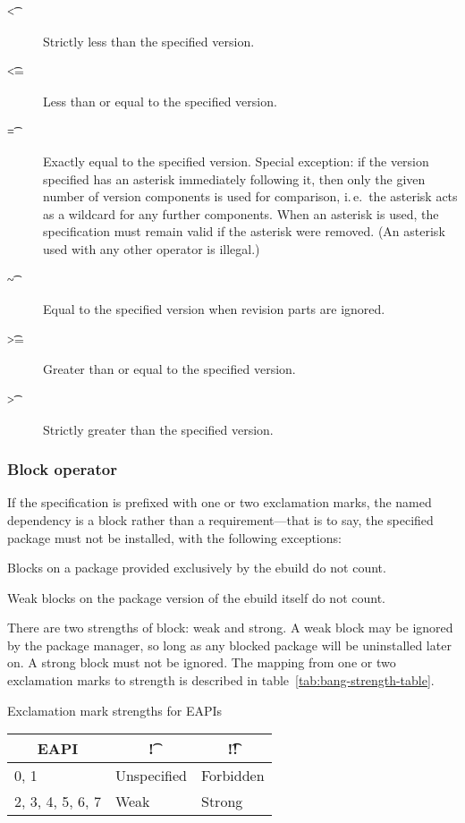 \begin{description}
\item[\t{<}] Strictly less than the specified version.
\item[\t{<=}] Less than or equal to the specified version.
\item[\t{=}] Exactly equal to the specified version. Special exception: if the version specified
    has an asterisk immediately following it, then only the given number of version components
    is used for comparison, i.\,e.\ the asterisk acts as a wildcard for any further components.
    When an asterisk is used, the specification must remain valid if the asterisk were removed.
    (An asterisk used with any other operator is illegal.)
\item[\t{\textasciitilde}] Equal to the specified version when revision parts are ignored.
\item[\t{>=}] Greater than or equal to the specified version.
\item[\t{>}] Strictly greater than the specified version.
\end{description}

\subsubsection{Block operator}

If the specification is prefixed with one or two exclamation marks, the named dependency is a block
rather than a requirement---that is to say, the specified package must not be installed, with the
following exceptions:

\begin{compactitem}
\item Blocks on a package provided exclusively by the ebuild do not count.
\item Weak blocks on the package version of the ebuild itself do not count.
\end{compactitem}

 There are two strengths of block: weak and strong. A weak block may be
ignored by the package manager, so long as any blocked package will be uninstalled later on. A
strong block must not be ignored. The mapping from one or two exclamation marks to strength is
described in table~\ref{tab:bang-strength-table}.

\begin{centertable}{Exclamation mark strengths for EAPIs}
    \label{tab:bang-strength-table}
    \begin{tabular}{lll}
      \toprule
      \multicolumn{1}{c}{\textbf{EAPI}} &
      \multicolumn{1}{c}{\textbf{\t{!}}} &
      \multicolumn{1}{c}{\textbf{\t{!!}}} \\
      \midrule
      0, 1              & Unspecified & Forbidden \\
      2, 3, 4, 5, 6, 7  & Weak        & Strong    \\
      \bottomrule
    \end{tabular}
\end{centertable}

